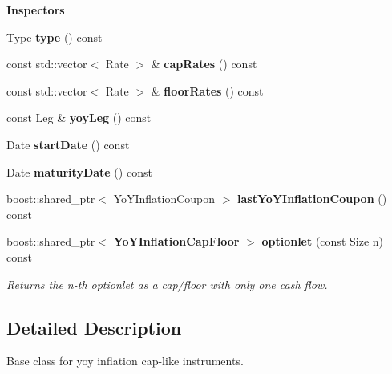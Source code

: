 \begin{Indent}{\bf Inspectors}\par
\begin{DoxyCompactItemize}
\item 
Type {\bfseries type} () const \label{class_quant_lib_1_1_yo_y_inflation_cap_floor_a6b1cf600c4349f9e1da97528c3c4ec06}

\item 
const std\+::vector$<$ Rate $>$ \& {\bfseries cap\+Rates} () const \label{class_quant_lib_1_1_yo_y_inflation_cap_floor_af09c3c229f7b4c4004305a7a5eb5a868}

\item 
const std\+::vector$<$ Rate $>$ \& {\bfseries floor\+Rates} () const \label{class_quant_lib_1_1_yo_y_inflation_cap_floor_a17feb1922cca9f6a8c851ceeb2f14da8}

\item 
const Leg \& {\bfseries yoy\+Leg} () const \label{class_quant_lib_1_1_yo_y_inflation_cap_floor_a691823b1e0657895c1b4c572f7078307}

\item 
Date {\bfseries start\+Date} () const \label{class_quant_lib_1_1_yo_y_inflation_cap_floor_a41aaded1c91b8cbaabc3bebc53f926bc}

\item 
Date {\bfseries maturity\+Date} () const \label{class_quant_lib_1_1_yo_y_inflation_cap_floor_a3e2081fad522a9ab053fcf38c8214e75}

\item 
boost\+::shared\+\_\+ptr$<$ Yo\+Y\+Inflation\+Coupon $>$ {\bfseries last\+Yo\+Y\+Inflation\+Coupon} () const \label{class_quant_lib_1_1_yo_y_inflation_cap_floor_a95991c4c5b21fb4451b0c886968f5980}

\item 
boost\+::shared\+\_\+ptr$<$ {\bf Yo\+Y\+Inflation\+Cap\+Floor} $>$ {\bf optionlet} (const Size n) const \label{class_quant_lib_1_1_yo_y_inflation_cap_floor_acfa19e3966024e8811e17b3b4abff6e5}

\begin{DoxyCompactList}\small\item\em Returns the n-\/th optionlet as a cap/floor with only one cash flow. \end{DoxyCompactList}\end{DoxyCompactItemize}
\end{Indent}


\subsection{Detailed Description}
Base class for yoy inflation cap-\/like instruments. 

